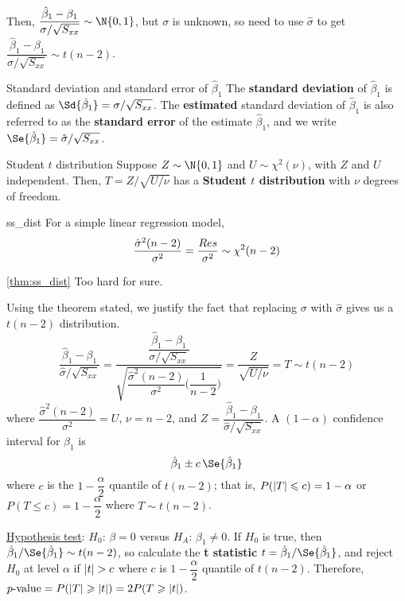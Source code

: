 Then, $ \dfrac{\hat{\beta}_1-\beta_1}{\sigma/\sqrt{S_{xx}}} \sim \N{0,1} $,
but $ \sigma $ is unknown, so need to use $ \hat{\sigma} $
to get
$ \dfrac{\hat{\beta}_1-\beta_1}{\hat{\sigma}/\sqrt{S_{xx}}}
    \sim t(n-2) $.
\begin{Definition}{Standard deviation and standard error of $ \hat{\beta}_1 $}{}
    The \textbf{standard deviation} of $ \hat{\beta}_1 $
    is defined as $ \Sd{\hat{\beta}_1}=\sigma/\sqrt{S_{xx}} $.
    The \textbf{estimated} standard deviation of $ \hat{\beta}_1 $
    is also referred to as the \textbf{standard error}
    of the estimate $ \hat{\beta}_1 $, and
    we write $ \Se{\hat{\beta}_1}=\hat{\sigma}/\sqrt{S_{xx}} $.
\end{Definition}
\begin{Definition}{Student $ t $ distribution}{}
    Suppose $ Z \sim \N{0,1} $
    and $ U \sim \chi^2(\nu) $,
    with $ Z $ and $ U $ independent. Then,
    $ T=Z/\sqrt{U/\nu} $ has a \textbf{Student $t$ distribution}
    with $ \nu $ degrees of freedom.
\end{Definition}
\begin{Theorem}{}{ss_dist}
    For a simple linear regression model,
    \[ \frac{\hat{\sigma}^2(n-2)}{\sigma^2}=\frac{\relax{Res}}{\sigma^2}
        \sim \chi^2(n-2) \]
\end{Theorem}
\begin{Proof}{\ref{thm:ss_dist}}{}
    Too hard for sure.
\end{Proof}
Using the theorem stated, we justify
the fact that replacing $ \sigma $ with $ \hat{\sigma} $
gives us a $ t(n-2) $ distribution.
\[ \frac{\hat{\beta}_1-\beta_1}{\hat{\sigma}/\sqrt{S_{xx}}}
    =\dfrac{\dfrac{\hat{\beta}_1-\beta_1}{\sigma/\sqrt{S_{xx}}}}{
        \sqrt{\dfrac{\hat{\sigma}^2(n-2)}{\sigma^2}\biggl( \dfrac{1}{n-2} \biggr)}
    }=
    \frac{Z}{\sqrt{U/\nu}}=T \sim t(n-2)  \]
where $ \dfrac{\hat{\sigma}^2(n-2)}{\sigma^2}=U $,
$ \nu=n-2 $, and $ Z=\dfrac{\hat{\beta}_1-\beta_1}{\hat{\sigma}/\sqrt{S_{xx}}} $.
A $ (1-\alpha) $ confidence interval for $ \beta_1 $ is
\[ \hat{\beta}_1\pm c\,\Se{\hat{\beta}_1} \]
where $ c $ is the $ 1-\dfrac{\alpha}{2} $ quantile
of $ t(n-2) $; that is,
$ P(\lvert T\rvert\leqslant c)=1-\alpha $ or
$ P(T\leqslant c)=1-\dfrac{\alpha}{2} $
where $ T \sim t(n-2) $.

\underline{Hypothesis test}:
$ H_0 $: $ \beta=0 $ versus
$ H_A $: $ \beta_1\neq 0 $.
If $ H_0 $ is true, then $ \hat{\beta}_1/\Se{\hat{\beta}_1} \sim t(n-2) $,
so calculate the \textbf{t statistic}
$ t=\hat{\beta}_1/\Se{\hat{\beta}_1} $,
and reject $ H_0 $ at level $ \alpha $ if $ \lvert t\rvert>c $
where $ c $ is $ 1-\dfrac{\alpha}{2} $ quantile of $ t(n-2) $.
Therefore,
$ p\text{-value}=P(\lvert T\rvert\geqslant \lvert t\rvert)
    =2P(T\geqslant \lvert t\rvert) $.
